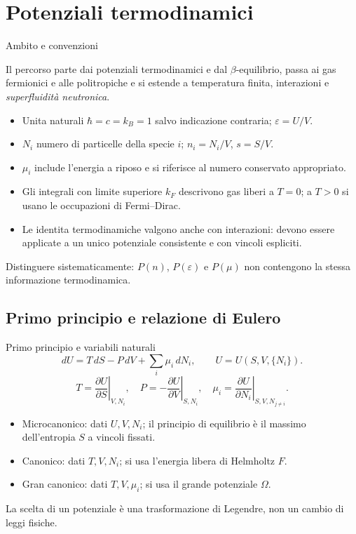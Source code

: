 \section{Potenziali termodinamici}

\begin{frame}[t]{Ambito e convenzioni}
\vspace*{3mm}
\small

Il percorso parte dai potenziali termodinamici e dal $\beta$-equilibrio,
passa ai gas fermionici e alle politropiche e si estende a temperatura
finita, interazioni e \emph{superfluidit\`a neutronica}.
\begin{itemize}
\item Unita naturali $\hbar=c=k_B=1$ salvo indicazione contraria; $\varepsilon=U/V$.
\item $N_i$ numero di particelle della specie $i$; $n_i=N_i/V$, $s=S/V$.
\item $\mu_i$ include l'energia a riposo e si riferisce al numero conservato appropriato.
\item Gli integrali con limite superiore $k_F$ descrivono gas liberi a $T=0$;
a $T>0$ si usano le occupazioni di Fermi--Dirac.
\item Le identita termodinamiche valgono anche con interazioni: devono
essere applicate a un unico potenziale consistente e con vincoli espliciti.
\end{itemize}
Distinguere sistematicamente: $P(n)$, $P(\varepsilon)$ e $P(\mu)$ non contengono la stessa informazione termodinamica.
\end{frame}

\subsection{Primo principio e relazione di Eulero}

\begin{frame}[t]{Primo principio e variabili naturali}
\vspace*{3mm}
\small
\[
dU=T\,dS-P\,dV+\sum_i\mu_i\,dN_i,
\qquad U=U(S,V,\{N_i\}).
\]
\[
T=\left.\frac{\partial U}{\partial S}\right|_{V,N_i},\quad
P=-\left.\frac{\partial U}{\partial V}\right|_{S,N_i},\quad
\mu_i=\left.\frac{\partial U}{\partial N_i}\right|_{S,V,N_{j\ne i}}.
\]
\begin{itemize}
\item Microcanonico: dati $U,V,N_i$; il principio di equilibrio \`e il massimo dell'entropia $S$ a vincoli fissati.
\item Canonico: dati $T,V,N_i$; si usa l'energia libera di Helmholtz $F$.
\item Gran canonico: dati $T,V,\mu_i$; si usa il grande potenziale $\Omega$.
\end{itemize}
La scelta di un potenziale \`e una trasformazione di Legendre, non un cambio di leggi fisiche.
\end{frame}

